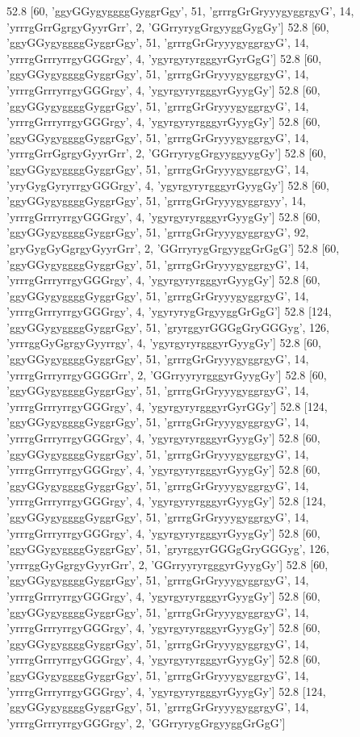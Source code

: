 52.8 [60, 'ggyGGygyggggGyggrGgy', 51, 'grrrgGrGryyygyggrgyG', 14, 'yrrrgGrrGgrgyGyyrGrr', 2, 'GGrryrygGrgyyggGygGy']
52.8 [60, 'ggyGGygyggggGyggrGgy', 51, 'grrrgGrGryyygyggrgyG', 14, 'yrrrgGrrryrrgyGGGrgy', 4, 'ygyrgyryrgggyrGyrGgG']
52.8 [60, 'ggyGGygyggggGyggrGgy', 51, 'grrrgGrGryyygyggrgyG', 14, 'yrrrgGrrryrrgyGGGrgy', 4, 'ygyrgyryrgggyrGyygGy']
52.8 [60, 'ggyGGygyggggGyggrGgy', 51, 'grrrgGrGryyygyggrgyG', 14, 'yrrrgGrrryrrgyGGGrgy', 4, 'ygyrgyryrgggyrGyygGy']
52.8 [60, 'ggyGGygyggggGyggrGgy', 51, 'grrrgGrGryyygyggrgyG', 14, 'yrrrgGrrGgrgyGyyrGrr', 2, 'GGrryrygGrgyyggyygGy']
52.8 [60, 'ggyGGygyggggGyggrGgy', 51, 'grrrgGrGryyygyggrgyG', 14, 'yryGygGyryrrgyGGGrgy', 4, 'ygyrgyryrgggyrGyygGy']
52.8 [60, 'ggyGGygyggggGyggrGgy', 51, 'grrrgGrGryyygyggrgyy', 14, 'yrrrgGrrryrrgyGGGrgy', 4, 'ygyrgyryrgggyrGyygGy']
52.8 [60, 'ggyGGygyggggGyggrGgy', 51, 'grrrgGrGryyygyggrgyG', 92, 'gryGygGyGgrgyGyyrGrr', 2, 'GGrryrygGrgyyggGrGgG']
52.8 [60, 'ggyGGygyggggGyggrGgy', 51, 'grrrgGrGryyygyggrgyG', 14, 'yrrrgGrrryrrgyGGGrgy', 4, 'ygyrgyryrgggyrGyygGy']
52.8 [60, 'ggyGGygyggggGyggrGgy', 51, 'grrrgGrGryyygyggrgyG', 14, 'yrrrgGrrryrrgyGGGrgy', 4, 'ygyryrygGrgyyggGrGgG']
52.8 [124, 'ggyGGygyggggGyggrGgy', 51, 'gryrggyrGGGgGryGGGyg', 126, 'yrrrggGyGgrgyGyyrrgy', 4, 'ygyrgyryrgggyrGyygGy']
52.8 [60, 'ggyGGygyggggGyggrGgy', 51, 'grrrgGrGryyygyggrgyG', 14, 'yrrrgGrrryrrgyGGGGrr', 2, 'GGrryyryrgggyrGyygGy']
52.8 [60, 'ggyGGygyggggGyggrGgy', 51, 'grrrgGrGryyygyggrgyG', 14, 'yrrrgGrrryrrgyGGGrgy', 4, 'ygyrgyryrgggyrGyrGGy']
52.8 [124, 'ggyGGygyggggGyggrGgy', 51, 'grrrgGrGryyygyggrgyG', 14, 'yrrrgGrrryrrgyGGGrgy', 4, 'ygyrgyryrgggyrGyygGy']
52.8 [60, 'ggyGGygyggggGyggrGgy', 51, 'grrrgGrGryyygyggrgyG', 14, 'yrrrgGrrryrrgyGGGrgy', 4, 'ygyrgyryrgggyrGyygGy']
52.8 [60, 'ggyGGygyggggGyggrGgy', 51, 'grrrgGrGryyygyggrgyG', 14, 'yrrrgGrrryrrgyGGGrgy', 4, 'ygyrgyryrgggyrGyygGy']
52.8 [124, 'ggyGGygyggggGyggrGgy', 51, 'grrrgGrGryyygyggrgyG', 14, 'yrrrgGrrryrrgyGGGrgy', 4, 'ygyrgyryrgggyrGyygGy']
52.8 [60, 'ggyGGygyggggGyggrGgy', 51, 'gryrggyrGGGgGryGGGyg', 126, 'yrrrggGyGgrgyGyyrGrr', 2, 'GGrryyryrgggyrGyygGy']
52.8 [60, 'ggyGGygyggggGyggrGgy', 51, 'grrrgGrGryyygyggrgyG', 14, 'yrrrgGrrryrrgyGGGrgy', 4, 'ygyrgyryrgggyrGyygGy']
52.8 [60, 'ggyGGygyggggGyggrGgy', 51, 'grrrgGrGryyygyggrgyG', 14, 'yrrrgGrrryrrgyGGGrgy', 4, 'ygyrgyryrgggyrGyygGy']
52.8 [60, 'ggyGGygyggggGyggrGgy', 51, 'grrrgGrGryyygyggrgyG', 14, 'yrrrgGrrryrrgyGGGrgy', 4, 'ygyrgyryrgggyrGyygGy']
52.8 [60, 'ggyGGygyggggGyggrGgy', 51, 'grrrgGrGryyygyggrgyG', 14, 'yrrrgGrrryrrgyGGGrgy', 4, 'ygyrgyryrgggyrGyygGy']
52.8 [124, 'ggyGGygyggggGyggrGgy', 51, 'grrrgGrGryyygyggrgyG', 14, 'yrrrgGrrryrrgyGGGrgy', 2, 'GGrryrygGrgyyggGrGgG']
